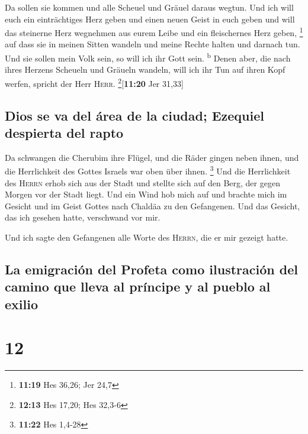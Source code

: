  Da sollen sie kommen und alle Scheuel und Gräuel daraus
wegtun.  Und ich will euch ein einträchtiges Herz geben
und einen neuen Geist in euch geben und will das steinerne Herz
wegnehmen aus eurem Leibe und ein fleischernes Herz geben, \footnote{\textbf{11:19}
  Hes 36,26; Jer 24,7}  auf dass sie in meinen Sitten
wandeln und meine Rechte halten und darnach tun. Und sie sollen mein
Volk sein, so will ich ihr Gott sein. \textsuperscript{b}
 Denen aber, die nach ihres Herzens Scheueln und Gräueln
wandeln, will ich ihr Tun auf ihren Kopf werfen, spricht der Herr
\textsc{Herr}. \footnote{\textbf{12:13} Hes 17,20; Hes 32,3-6}{[}\textbf{11:20}
Jer 31,33{]}

\hypertarget{dios-se-va-del-uxe1rea-de-la-ciudad-ezequiel-despierta-del-rapto}{%
\subsection{Dios se va del área de la ciudad; Ezequiel despierta del
rapto}\label{dios-se-va-del-uxe1rea-de-la-ciudad-ezequiel-despierta-del-rapto}}

 Da schwangen die Cherubim ihre Flügel, und die Räder
gingen neben ihnen, und die Herrlichkeit des Gottes Israels war oben
über ihnen. \footnote{\textbf{11:22} Hes 1,4-28}  Und die
Herrlichkeit des \textsc{Herrn} erhob sich aus der Stadt und stellte
sich auf den Berg, der gegen Morgen vor der Stadt liegt. 
Und ein Wind hob mich auf und brachte mich im Gesicht und im Geist
Gottes nach Chaldäa zu den Gefangenen. Und das Gesicht, das ich gesehen
hatte, verschwand vor mir.

 Und ich sagte den Gefangenen alle Worte des
\textsc{Herrn}, die er mir gezeigt hatte.

\hypertarget{la-emigraciuxf3n-del-profeta-como-ilustraciuxf3n-del-camino-que-lleva-al-pruxedncipe-y-al-pueblo-al-exilio}{%
\subsection{La emigración del Profeta como ilustración del camino que
lleva al príncipe y al pueblo al
exilio}\label{la-emigraciuxf3n-del-profeta-como-ilustraciuxf3n-del-camino-que-lleva-al-pruxedncipe-y-al-pueblo-al-exilio}}

\hypertarget{section-11}{%
\section{12}\label{section-11}}


